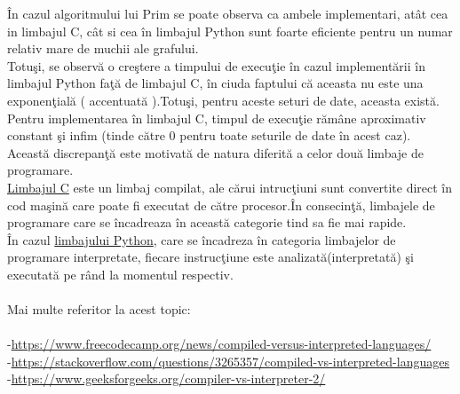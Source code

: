 \documentclass[14pt]{article}
\begin{document}
\vspace{4mm}
\^In cazul algoritmului lui Prim se poate observa ca ambele implementari, at\^at cea in limbajul C, c\^at si cea \^in limbajul Python sunt foarte eficiente pentru un numar relativ mare de muchii ale grafului.\\
   Totu\c si, se observ\u{a} o cre\c stere a timpului de execu\c tie \^in cazul implement\u{a}rii \^in limbajul Python fa\c t\u{a} de limbajul C, \^in ciuda faptului c\u{a} aceasta nu este una exponen\c tial\u{a} ( accentuat\u{a} ).Totu\c si, pentru aceste seturi de date, aceasta exist\u{a}.\\
Pentru implementarea \^in limbajul C, timpul de execu\c tie r\u{a}m\^ane aproximativ constant \c si infim (tinde c\u{a}tre 0 pentru toate seturile de date \^in acest caz).\\
Aceast\u{a} discrepan\c t\u{a} este motivat\u{a} de natura diferit\u{a} a celor dou\u{a} limbaje de programare.\\\underline{Limbajul C} este un limbaj compilat, ale c\u{a}rui intruc\c tiuni sunt convertite direct \^in cod ma\c sin\u{a} care poate fi executat de c\u{a}tre procesor.\^In consecin\c t\u{a}, limbajele de programare care se \^incadreaza \^in aceast\u{a} categorie tind sa fie mai rapide.\\
\^In cazul \underline{limbajului Python}, care se \^incadreza \^in categoria limbajelor de programare interpretate, fiecare instruc\c tiune este analizat\u{a}(interpretat\u{a}) \c si executat\u{a} pe r\^and la momentul respectiv.\\
\\
Mai multe referitor la acest topic:\\\\ -\textcolor{blue}{\url{https://www.freecodecamp.org/news/compiled-versus-interpreted-languages/}}\\ -\textcolor{blue}{\url{https://stackoverflow.com/questions/3265357/compiled-vs-interpreted-languages}}\\ 
-\textcolor{blue}{\url{https://www.geeksforgeeks.org/compiler-vs-interpreter-2/}}\\
\end{document}

